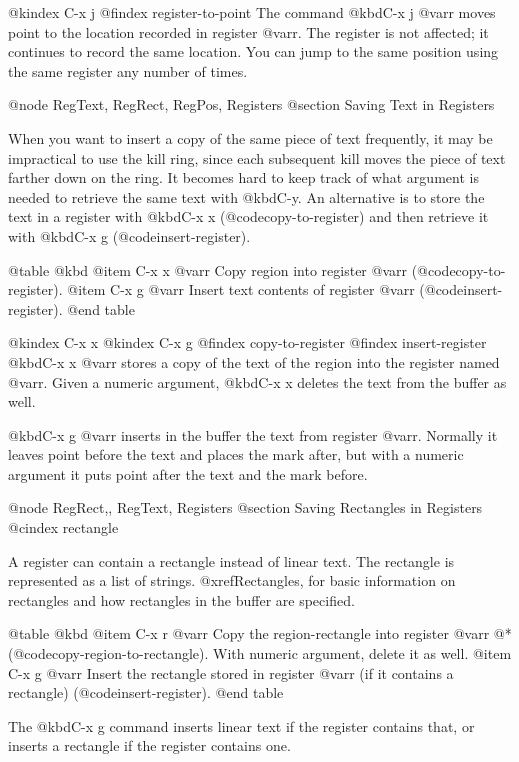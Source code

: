{{{{{{{@kindex C-x j
@findex register-to-point
  The command @kbd{C-x j @var{r}} moves point to the location recorded
in register @var{r}.  The register is not affected; it continues to
record the same location.  You can jump to the same position using the
same register any number of times.

@node RegText, RegRect, RegPos, Registers
@section Saving Text in Registers

  When you want to insert a copy of the same piece of text frequently, it
may be impractical to use the kill ring, since each subsequent kill moves
the piece of text farther down on the ring.  It becomes hard to keep track
of what argument is needed to retrieve the same text with @kbd{C-y}.  An
alternative is to store the text in a register with @kbd{C-x x}
(@code{copy-to-register}) and then retrieve it with @kbd{C-x g}
(@code{insert-register}).

@table @kbd
@item C-x x @var{r}
Copy region into register @var{r} (@code{copy-to-register}).
@item C-x g @var{r}
Insert text contents of register @var{r} (@code{insert-register}).
@end table

@kindex C-x x
@kindex C-x g
@findex copy-to-register
@findex insert-register
  @kbd{C-x x @var{r}} stores a copy of the text of the region into the
register named @var{r}.  Given a numeric argument, @kbd{C-x x} deletes the
text from the buffer as well.

  @kbd{C-x g @var{r}} inserts in the buffer the text from register @var{r}.
Normally it leaves point before the text and places the mark after, but
with a numeric argument it puts point after the text and the mark before.

@node RegRect,, RegText, Registers
@section Saving Rectangles in Registers
@cindex rectangle

  A register can contain a rectangle instead of linear text.  The rectangle
is represented as a list of strings.  @xref{Rectangles}, for basic
information on rectangles and how rectangles in the buffer are specified.

@table @kbd
@item C-x r @var{r}
Copy the region-rectangle into register @var{r} @*(@code{copy-region-to-rectangle}).
With numeric argument, delete it as well.
@item C-x g @var{r}
Insert the rectangle stored in register @var{r} (if it contains a
rectangle) (@code{insert-register}).
@end table

  The @kbd{C-x g} command inserts linear text if the register contains
that, or inserts a rectangle if the register contains one.

}}}}}}}
